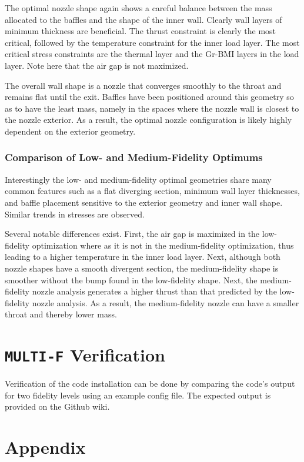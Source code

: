 \documentclass{article}
\begin{document}
The optimal nozzle shape again shows a careful balance between the mass allocated to the baffles and the shape of the inner wall. Clearly wall layers of minimum thickness are beneficial. The thrust constraint is clearly the most critical, followed by the temperature constraint for the inner load layer. The most critical stress constraints are the thermal layer and the Gr-BMI layers in the load layer. Note here that the air gap is not maximized.

The overall wall shape is a nozzle that converges smoothly to the throat and remains flat until the exit. Baffles have been positioned around this geometry so as to have the least mass, namely in the spaces where the nozzle wall is closest to the nozzle exterior. As a result, the optimal nozzle configuration is likely highly dependent on the exterior geometry.

\subsubsection{Comparison of Low- and Medium-Fidelity Optimums}

Interestingly the low- and medium-fidelity optimal geometries share many common features such as a flat diverging section, minimum wall layer thicknesses, and baffle placement sensitive to the exterior geometry and inner wall shape. Similar trends in stresses are observed.

Several notable differences exist. First, the air gap is maximized in the low-fidelity optimization where as it is not in the medium-fidelity optimization, thus leading to a higher temperature in the inner load layer. Next, although both nozzle shapes have a smooth divergent section, the medium-fidelity shape is smoother without the bump found in the low-fidelity shape. Next, the medium-fidelity nozzle analysis generates a higher thrust than that predicted by the low-fidelity nozzle analysis. As a result, the medium-fidelity nozzle can have a smaller throat and thereby lower mass.

\section{\texttt{MULTI-F} Verification} \label{sec:verification}

Verification of the code installation can be done by comparing the code's output for two fidelity levels using an example config file. The expected output is provided on the Github wiki.

\section{Appendix} \label{sec:appendix}
\end{document}
